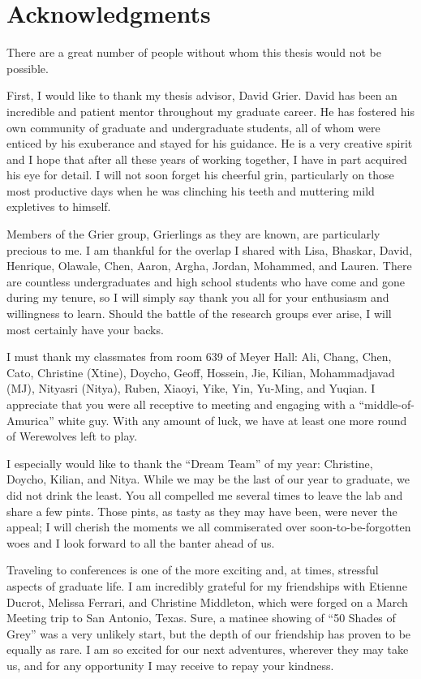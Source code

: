 \chapter*{Acknowledgments}
\label{ch:acknowledgments}

There are a great number of people without whom this thesis
would not be possible.

First, I would like to thank my thesis advisor, David Grier. David has been
an incredible and patient mentor throughout my graduate career.
He has fostered his own community of graduate and undergraduate
students, all of whom were enticed by his exuberance and stayed for
his guidance. He is a very creative spirit and I hope that after
all these years of working together, I have in part acquired his eye for detail.
I will not soon forget his cheerful grin, particularly on those
most productive days when he was clinching his teeth and muttering
mild expletives to himself.

Members of the Grier group, Grierlings as they are known, are
particularly precious to me. I am thankful for the overlap I shared
with Lisa, Bhaskar, David, Henrique, Olawale, Chen, Aaron,
Argha, Jordan, Mohammed, and Lauren. There are countless
undergraduates and high school students who have come
and gone during my tenure, so I will simply say thank you all for
your enthusiasm and willingness to learn. Should the battle of the
research groups ever arise, I will most certainly have your backs.

I must thank my classmates from room 639 of Meyer Hall:
Ali, Chang, Chen, Cato, Christine (Xtine), Doycho, Geoff, Hossein,
Jie, Kilian, Mohammadjavad (MJ), Nityasri (Nitya), Ruben, Xiaoyi,
Yike, Yin, Yu-Ming, and Yuqian. I appreciate that you were all
receptive to meeting and engaging with a ``middle-of-Amurica''
white guy. With any amount of luck, we have at least one
more round of Werewolves left to play.

I especially would like to thank the ``Dream Team'' of my year:
Christine, Doycho, Kilian, and Nitya. While we may be the last of our
year to graduate, we did not drink the least. You all compelled me
several times to leave the lab and share a few pints. Those
pints, as tasty as they may have been, were never the appeal; I
will cherish the moments we all commiserated over soon-to-be-forgotten
woes and I look forward to all the banter ahead of us.

Traveling to conferences is one of the more exciting and, at
times, stressful aspects of graduate life. I am incredibly grateful
for my friendships with Etienne Ducrot, Melissa Ferrari, and Christine
Middleton, which were forged on a March Meeting trip
to San Antonio, Texas. Sure, a matinee showing of ``50 Shades of Grey''
was a very unlikely start, but the depth of our friendship has proven to
be equally as rare. I am so excited for our next adventures, wherever
they may take us, and for any opportunity I may receive to repay your kindness.

